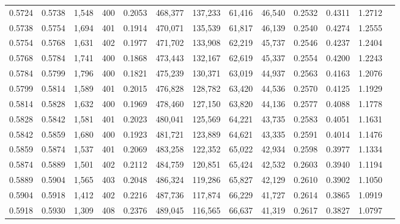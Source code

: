 \begin{tabular}{rrrrrrrrrrrrr}
0.5724 & 0.5738 &  1,548 & 400 &                                     0.2053 & 468,377 & 137,233 &  61,416 &  46,540 & 0.2532 & 0.4311 & 1.2712 \\
0.5738 & 0.5754 &  1,694 & 401 &                                     0.1914 & 470,071 & 135,539 &  61,817 &  46,139 & 0.2540 & 0.4274 & 1.2555 \\
0.5754 & 0.5768 &  1,631 & 402 &                                     0.1977 & 471,702 & 133,908 &  62,219 &  45,737 & 0.2546 & 0.4237 & 1.2404 \\
0.5768 & 0.5784 &  1,741 & 400 &                                     0.1868 & 473,443 & 132,167 &  62,619 &  45,337 & 0.2554 & 0.4200 & 1.2243 \\
0.5784 & 0.5799 &  1,796 & 400 &                                     0.1821 & 475,239 & 130,371 &  63,019 &  44,937 & 0.2563 & 0.4163 & 1.2076 \\
0.5799 & 0.5814 &  1,589 & 401 &                                     0.2015 & 476,828 & 128,782 &  63,420 &  44,536 & 0.2570 & 0.4125 & 1.1929 \\
0.5814 & 0.5828 &  1,632 & 400 &                                     0.1969 & 478,460 & 127,150 &  63,820 &  44,136 & 0.2577 & 0.4088 & 1.1778 \\
0.5828 & 0.5842 &  1,581 & 401 &                                     0.2023 & 480,041 & 125,569 &  64,221 &  43,735 & 0.2583 & 0.4051 & 1.1631 \\
0.5842 & 0.5859 &  1,680 & 400 &                                     0.1923 & 481,721 & 123,889 &  64,621 &  43,335 & 0.2591 & 0.4014 & 1.1476 \\
0.5859 & 0.5874 &  1,537 & 401 &                                     0.2069 & 483,258 & 122,352 &  65,022 &  42,934 & 0.2598 & 0.3977 & 1.1334 \\
0.5874 & 0.5889 &  1,501 & 402 &                                     0.2112 & 484,759 & 120,851 &  65,424 &  42,532 & 0.2603 & 0.3940 & 1.1194 \\
0.5889 & 0.5904 &  1,565 & 403 &                                     0.2048 & 486,324 & 119,286 &  65,827 &  42,129 & 0.2610 & 0.3902 & 1.1050 \\
0.5904 & 0.5918 &  1,412 & 402 &                                     0.2216 & 487,736 & 117,874 &  66,229 &  41,727 & 0.2614 & 0.3865 & 1.0919 \\
0.5918 & 0.5930 &  1,309 & 408 &                                     0.2376 & 489,045 & 116,565 &  66,637 &  41,319 & 0.2617 & 0.3827 & 1.0797 \\

\end{tabular}
